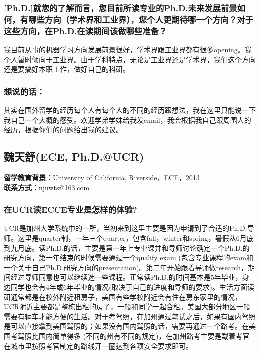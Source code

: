 \documentclass[a4paper,UTF8]{book}
\begin{document}
    \subsubsection*{[Ph.D.]就您的了解而言，您目前所读专业的Ph.D.未来发展前景如何，有哪些方向（学术界和工业界），您个人更期待哪一个方向？对于这些方向，在Ph.D.在读期间该做哪些准备？}
    我目前从事的机器学习方向发展前景很好，学术界跟工业界都有很多opening。我个人暂时倾向于工业界。由于学科特点，无论是工业界还是学术界，我们这个方向还是要搞好本职工作，做好自己的科研。
                    
    \subsubsection{想说的话：}
    其实在国外留学的经历每个人有每个人的不同的经历跟想法，我在这里只能说一下我自己一个大概的感受。欢迎学弟学妹给我发email，我会根据我自己跟周围人的经历，根据你们的问题给出我的建议。



\clearpage
\subsection{魏天舒(ECE, Ph.D.@UCR)}
    \textbf{留学教育背景：}University of California, Riverside，ECE，2013\\
    \textbf{联系方式：}njuwts@163.com

    \subsubsection*{在UCR读ECCE专业是怎样的体验?}
    UCR是加州大学系统中的一所，当初来到这里主要是因为申请到了合适的Ph.D.导师。这里是quarter制，一年三个quarter，包含fall，winter和spring，暑假从6月底到九月底。读Ph.D.的话，主要是第一年上专业课并和导师讨论确定一个Ph.D.的研究方向，第一年结束的时候需要通过一个qualify exam (包含专业课程的exam和一个关于自己Ph.D.研究方向的presentation)。第二年开始跟着导师做research，期间经过导师同意也可以继续选一些课程。正常读Ph.D.的时间基本是5年毕业，身边同学也会有4年或6年毕业的情况(取决于自己的进度和导师的要求)。生活方面读研通常都是在校外附近租房子，美国有些学校附近会有住在房东家里的情况，UCR附近主要都是整栋出租的房子，一般和同学一起合租。美国大部分地区一般需要有辆车才能方便的生活。对于考驾照，在加州通过笔试之后，如果有国内驾照是可以直接拿到美国驾照的；如果没有国内驾照的话，需要再通过一个路考。在美国考驾照比国内简单得多 (不同的州有不同的规定)，在加州路考主要是载着考官在城市里按照考官制定的路线开一圈达到各项安全要求即可。
\end{document}
